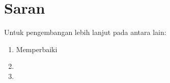 \section{Saran}
\label{chap:saran}

Untuk pengembangan lebih lanjut pada \lipsum[1][1-3] antara lain:

\begin{enumerate}[nolistsep]

  \item Memperbaiki \lipsum[2][1-3]

  \item \lipsum[2][4-6]

  \item \lipsum[2][7-10]

\end{enumerate}
